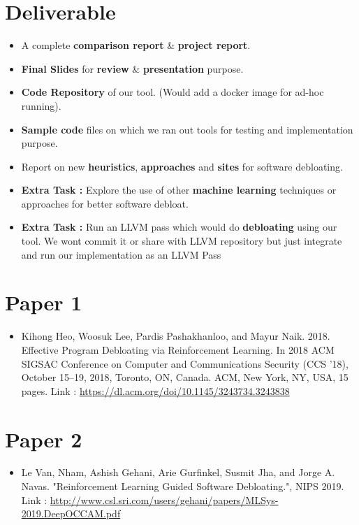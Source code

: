 \documentclass{article} %
\begin{document}
\section*{Deliverable} 
    \begin{itemize}
        \item A complete \textbf{comparison report} \& \textbf{project report}.
        \item \textbf{Final Slides} for \textbf{review} \& \textbf{presentation} purpose.
        \item \textbf{Code Repository} of our tool. (Would add a docker image for ad-hoc running).
        \item \textbf{Sample code} files on which we ran out tools for testing and implementation purpose.  
        \item Report on new \textbf{heuristics}, \textbf{approaches} and \textbf{sites} for software debloating.  
        \item \textbf{Extra Task :} Explore the use of other \textbf{machine learning} techniques or approaches for better software debloat.
        \item \textbf{Extra Task :} Run an LLVM pass which would do \textbf{debloating} using our tool. \color{blue} We wont commit it or share with LLVM repository but just integrate and run our implementation as an LLVM Pass \color{black}  
    \end{itemize}

\section*{Paper 1}
\begin{itemize}
    \item \color{blue} Kihong Heo, Woosuk Lee, Pardis Pashakhanloo, and Mayur Naik. 2018.
    Effective Program Debloating via Reinforcement Learning. In 2018 ACM
    SIGSAC Conference on Computer and Communications Security (CCS ’18), October
    15–19, 2018, Toronto, ON, Canada. ACM, New York, NY, USA, 15 pages. \color{black} Link :
    \url{https://dl.acm.org/doi/10.1145/3243734.3243838}
\end{itemize}

\section*{Paper 2}
\begin{itemize}
    \item \color{blue} Le Van, Nham, Ashish Gehani, Arie Gurfinkel, Susmit Jha, and Jorge A. Navas. "Reinforcement Learning Guided Software Debloating.", NIPS 2019. \color{black} Link : \url{http://www.csl.sri.com/users/gehani/papers/MLSys-2019.DeepOCCAM.pdf} 
\end{itemize}
\end{document}
